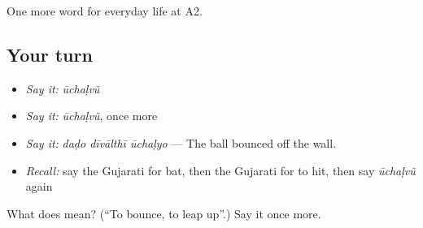 \begin{grammarlens}[title={What you've built}]
One more word for everyday life at A2.
\end{grammarlens}

\subsection*{Your turn}
\begin{itemize}
\raggedright
  \item \emph{Say it:} \emph{ūchaḷvũ}
  \item \emph{Say it:} \emph{ūchaḷvũ}, once more
  \item \emph{Say it:} \emph{daḍo dīvālthī ūchaḷyo} — The ball bounced off the wall.
  \item \emph{Recall:} say the Gujarati for bat, then the Gujarati for to hit, then say \emph{ūchaḷvũ} again
\end{itemize}

\begin{tcolorbox}[breakable,colback=teal!4,colframe=teal!35!black,title={Before you move on}]
What does  mean? (\textquotedblleft{}To bounce, to leap up\textquotedblright{}.) Say it once more.
\end{tcolorbox}

